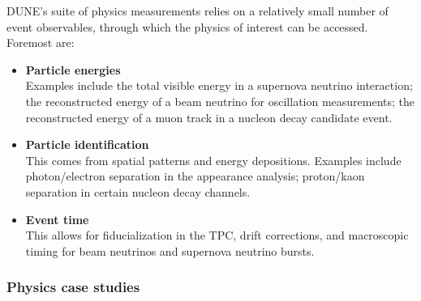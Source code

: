 DUNE's suite of physics measurements relies on a relatively small
number of event observables, through which the physics of interest
can be accessed.  Foremost are:
%                                                                                                
\begin{itemize}
\item {\bf Particle energies}  \\
Examples include the total visible energy in a supernova
neutrino interaction; the reconstructed energy of a beam
neutrino for oscillation measurements; the reconstructed
energy of a muon track in a nucleon decay candidate event.

\item {\bf Particle identification}  \\
This comes from spatial patterns and energy depositions.
Examples include photon/electron separation in the \nue{}
appearance analysis; proton/kaon separation in certain
nucleon decay channels.

\item {\bf Event time} \\
This allows for fiducialization
in the TPC, drift corrections, and macroscopic timing for
beam neutrinos and supernova neutrino bursts.
\end{itemize}



\subsubsection{Physics case studies}

